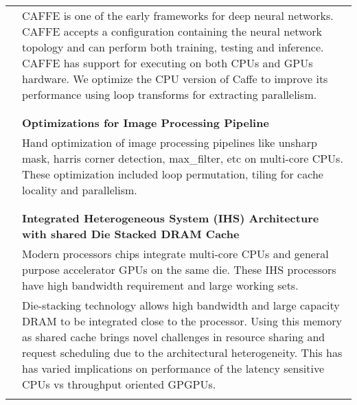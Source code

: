 \documentclass[a4paper,10pt]{article} %
\begin{document}
\begin{tabular}{rp{11cm}}
& \setlength{\leftskip}{0.4cm}
CAFFE is one of the early frameworks for deep neural networks. CAFFE accepts a configuration containing the neural network topology and can perform both training, testing and inference. CAFFE has support for executing  on both CPUs and GPUs hardware. We optimize the CPU version of Caffe to improve its performance using loop transforms for extracting parallelism.\\
& \\
& \\
& \textbf{Optimizations for Image Processing Pipeline} \\
& \setlength{\leftskip}{0.4cm}
Hand optimization of image processing pipelines like unsharp mask, harris corner detection, max\_filter, etc on multi-core CPUs. These optimization included loop permutation, tiling for cache locality and parallelism.\\
&\\
& \\
& \textbf{Integrated Heterogeneous System (IHS) Architecture with shared Die Stacked DRAM Cache} \\
& \setlength{\leftskip}{0.4cm}
Modern processors chips integrate multi-core CPUs and general purpose accelerator GPUs on the same die. These IHS processors have high bandwidth requirement and large working sets.\\
& \setlength{\leftskip}{0.4cm} 
Die-stacking technology allows high bandwidth and large capacity DRAM to be integrated close to the processor. Using this memory as shared cache brings novel challenges in resource sharing and request scheduling due to the architectural heterogeneity. This has has varied implications on performance of the latency sensitive CPUs vs throughput oriented GPGPUs.\\
&\\
\end{tabular}
\end{document}
